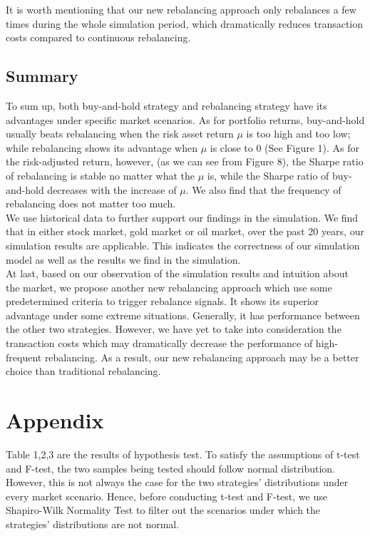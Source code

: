\documentclass[
10pt, %
a4paper, %
oneside, %
headinclude,footinclude, %
BCOR5mm, %
]{scrartcl}
\begin{document}
It is worth mentioning that our new rebalancing approach only rebalances a few times during the whole simulation period, which dramatically reduces transaction costs compared to continuous rebalancing.\\

\subsection{Summary}

To sum up, both buy-and-hold strategy and rebalancing strategy have its advantages under specific market scenarios. As for portfolio returns, buy-and-hold usually beats rebalancing when the risk asset return $\mu$ is too high and too low; while rebalancing shows its advantage when $\mu$ is close to 0 (See Figure 1). As for the risk-adjusted return, however, (as we can see from Figure 8), the Sharpe ratio of rebalancing is stable no matter what the $\mu$ is, while the Sharpe ratio of buy-and-hold decreases with the increase of $\mu$. We also find that the frequency of rebalancing does not matter too much.\\

We use historical data to further support our findings in the simulation. We find that in either stock market, gold market or oil market, over the past 20 years, our simulation results are applicable. This indicates the correctness of our simulation model as well as the results we find in the simulation.\\

At last, based on our observation of the simulation results and intuition about the market, we propose another new rebalancing approach which use some predetermined criteria to trigger rebalance signals. It shows its superior advantage under some extreme situations. Generally, it has performance between the other two strategies. However, we have yet to take into consideration the transaction costs which may dramatically decrease the performance of high-frequent rebalancing. As a result, our new rebalancing approach may be a better choice than traditional rebalancing. 

\section{Appendix}

Table 1,2,3 are the results of hypothesis test. To satisfy the assumptions of t-test and F-test, the two samples being tested should follow normal distribution. However, this is not always the case for the two strategies' distributions under every market scenario. Hence, before conducting t-test and F-test, we use Shapiro-Wilk Normality Test to filter out the scenarios under which the strategies' distributions are not normal.\\
\end{document}
